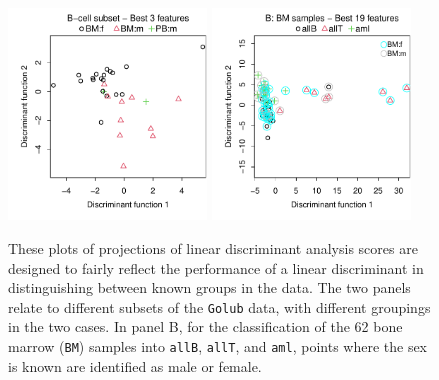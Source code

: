 \documentclass{article}\usepackage[]{graphicx}\usepackage[]{xcolor}
\newenvironment{knitrout}{}{} %
\begin{document}
\begin{figure}
\begin{knitrout}
\color{fgcolor}

{\centering \includegraphics[width=0.47\textwidth]{figs/key-cv-Bcell-gphAB-1} 
\includegraphics[width=0.47\textwidth]{figs/key-cv-Bcell-gphAB-2} 

}


\end{knitrout}
\caption{These plots of projections of linear discriminant analysis
  scores are designed to fairly reflect the performance of a linear
  discriminant in distinguishing between known groups in the data. The
  two panels relate to different subsets of the \texttt{Golub} data,
  with different groupings in the two cases.  In panel B, for the
  classification of the 62 bone marrow (\texttt{BM}) samples into
  \texttt{allB}, \texttt{allT}, and \texttt{aml}, points where the sex
  is known are identified as male or female.}
\end{figure}
\end{document}
